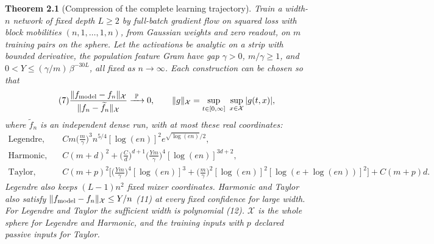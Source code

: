 \documentclass[12pt,border=2pt]{standalone}
\begin{document}
\begin{minipage}{7.95in}
\setlength{\abovedisplayskip}{5pt}\setlength{\belowdisplayskip}{5pt}
\setlength{\abovedisplayshortskip}{3pt}\setlength{\belowdisplayshortskip}{5pt}
\textbf{Theorem 2.1} (Compression of the complete learning trajectory).
\textit{Train a width-$n$ network of fixed depth $L\ge2$ by full-batch gradient
flow on squared loss with block mobilities $(n,1,\dots,1,n)$, from Gaussian
weights and zero readout, on $m$ training pairs on the sphere. Let the
activations be analytic on a strip with bounded derivative, the population
feature Gram have gap $\gamma>0$, $m/\gamma\ge1$, and
$0<Y\le(\gamma/m)\,\beta^{-30L}$, all fixed as $n\to\infty$. Each
construction can be chosen so that}
\begin{equation}\tag{7}
 \frac{\|f_{\rm model}-f_n\|_{\mathcal X}}{\|f_n-\widetilde f_n\|_{\mathcal X}}
 \xrightarrow{\ \mathbb P\ }0,
 \qquad
 \|g\|_{\mathcal X}=\sup_{t\in[0,\infty]}\ \sup_{x\in\mathcal X}|g(t,x)|,
\end{equation}
\textit{where $\widetilde f_n$ is an independent dense run, with at most these
real coordinates:}
\begin{align}
 \text{Legendre, moving:}\quad&
 Cm\Big(\frac m\gamma\Big)^3 n^{5/4}[\log(en)]^2e^{\sqrt{\log(en)}/2},
 \tag{8}\\
 \text{Harmonic, total:}\quad&
 C(m+d)^2+\Big(\frac Cd\Big)^{d+1}\Big(\frac{Ym}\gamma\Big)^4[\log(en)]^{3d+2},
 \tag{9}\\
 \text{Taylor, total:}\quad&
 C(m+p)^2\Big[\Big(\frac{Ym}\gamma\Big)^4[\log(en)]^3
 +\Big(\frac m\gamma\Big)^2[\log(en)]^2[\log(e+\log(en))]^2\Big]
 +C(m+p)d.
 \tag{10}
\end{align}
\textit{Legendre also keeps $(L-1)n^2$ fixed mixer coordinates. Harmonic and
Taylor also satisfy $\|f_{\rm model}-f_n\|_{\mathcal X}\le Y/n$ \textup{(11)} at
every fixed confidence for large width. For Legendre and Taylor the
sufficient width is polynomial \textup{(12)}. $\mathcal X$ is the whole sphere
for Legendre and Harmonic, and the training inputs with $p$ declared passive
inputs for Taylor.}
\end{minipage}
\end{document}
